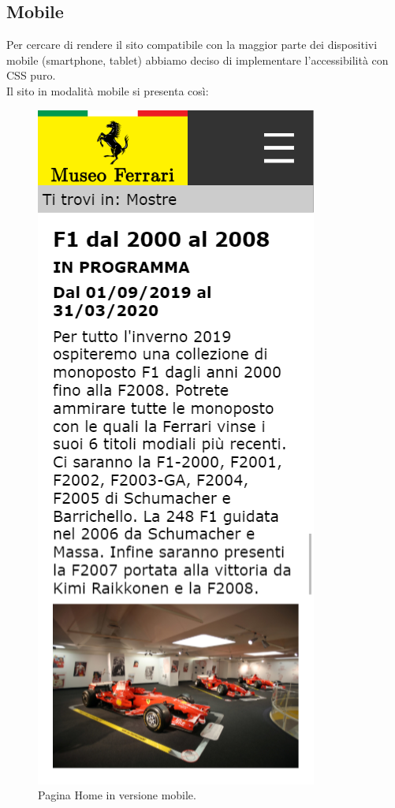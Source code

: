\subsection{Mobile}
Per cercare di rendere il sito compatibile con la maggior parte dei dispositivi mobile (smartphone, tablet)
abbiamo deciso di implementare l'accessibilità con CSS puro.\\
Il sito in modalità mobile si presenta così:
\begin{figure}[H]
	\begin{center}
		\includegraphics[scale=.3]{Images/home_mobile.png}
		\caption{Pagina Home in versione mobile.}
	\end{center}
\end{figure}
